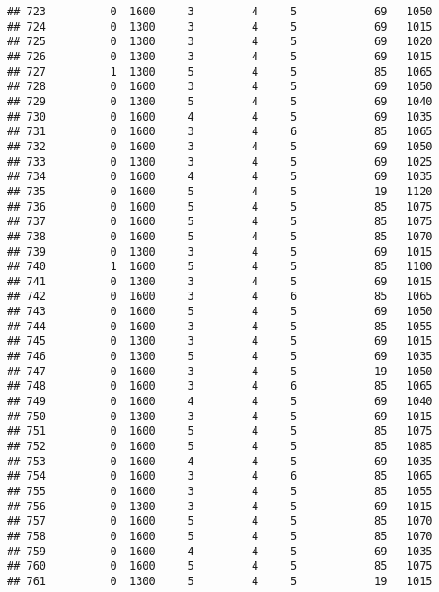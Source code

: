 \documentclass[]{article}
\begin{document}
\begin{verbatim}
## 723          0  1600     3         4     5            69   1050
## 724          0  1300     3         4     5            69   1015
## 725          0  1300     3         4     5            69   1020
## 726          0  1300     3         4     5            69   1015
## 727          1  1300     5         4     5            85   1065
## 728          0  1600     3         4     5            69   1050
## 729          0  1300     5         4     5            69   1040
## 730          0  1600     4         4     5            69   1035
## 731          0  1600     3         4     6            85   1065
## 732          0  1600     3         4     5            69   1050
## 733          0  1300     3         4     5            69   1025
## 734          0  1600     4         4     5            69   1035
## 735          0  1600     5         4     5            19   1120
## 736          0  1600     5         4     5            85   1075
## 737          0  1600     5         4     5            85   1075
## 738          0  1600     5         4     5            85   1070
## 739          0  1300     3         4     5            69   1015
## 740          1  1600     5         4     5            85   1100
## 741          0  1300     3         4     5            69   1015
## 742          0  1600     3         4     6            85   1065
## 743          0  1600     5         4     5            69   1050
## 744          0  1600     3         4     5            85   1055
## 745          0  1300     3         4     5            69   1015
## 746          0  1300     5         4     5            69   1035
## 747          0  1600     3         4     5            19   1050
## 748          0  1600     3         4     6            85   1065
## 749          0  1600     4         4     5            69   1040
## 750          0  1300     3         4     5            69   1015
## 751          0  1600     5         4     5            85   1075
## 752          0  1600     5         4     5            85   1085
## 753          0  1600     4         4     5            69   1035
## 754          0  1600     3         4     6            85   1065
## 755          0  1600     3         4     5            85   1055
## 756          0  1300     3         4     5            69   1015
## 757          0  1600     5         4     5            85   1070
## 758          0  1600     5         4     5            85   1070
## 759          0  1600     4         4     5            69   1035
## 760          0  1600     5         4     5            85   1075
## 761          0  1300     5         4     5            19   1015

\end{verbatim}
\end{document}

